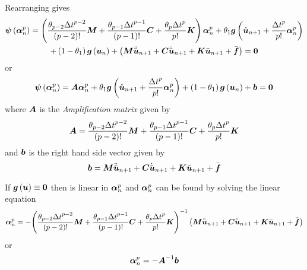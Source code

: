 Rearranging gives
\begin{multline}
  \fnof{\vect{\psi}}{\vect{\alpha}^{p}_{n}}=\pbrac{\dfrac{\theta_{p-2}{\Delta
        t}^{p-2}}{\factorial{p-2}}\matr{M}+\dfrac{\theta_{p-1}{\Delta
        t}^{p-1}}{\factorial{p-1}}\matr{C}+\dfrac{\theta_{p}{\Delta
        t}^{p}}{p!}\matr{K}}\vect{\alpha}^{p}_{n}+\theta_{1}\fnof{\vect{g}}{\hat{\vect{u}}_{n+1}+ 
    \dfrac{{\Delta t}^{p}}{p!}\vect{\alpha}^{p}_{n}} \\
  +\pbrac{1-\theta_{1}}\fnof{\vect{g}}{\vect{u}_{n}}+
  \pbrac{\matr{M}\ddot{\bar{\vect{u}}}_{n+1}+\matr{C}\dot{\bar{\vect{u}}}_{n+1}+\matr{K}\bar{\vect{u}}_{n+1}+
    \bar{\vect{f}}}= \vect{0}
  \label{eqn:transient}
\end{multline}
or 
\begin{equation}
\fnof{\vect{\psi}}{\vect{\alpha}^{p}_{n}}=\matr{A}\vect{\alpha}^{p}_{n}+
\theta_{1}\fnof{\vect{g}}{\hat{\vect{u}}_{n+1}+ \dfrac{{\Delta
      t}^{p}}{p!}\vect{\alpha}^{p}_{n}}+\pbrac{1-\theta_{1}}\fnof{\vect{g}}{\vect{u}_{n}}+\vect{b}= \vect{0}
\end{equation}
where $\matr{A}$ is the \emph{Amplification matrix} given by
\begin{equation}
  \matr{A}=\dfrac{\theta_{p-2}{\Delta t}^{p-2}}{\factorial{p-2}}\matr{M}+
  \dfrac{\theta_{p-1}{\Delta t}^{p-1}}{\factorial{p-1}}\matr{C}+
  \dfrac{\theta_{p}{\Delta t}^{p}}{p!}\matr{K}
\end{equation}
and $\vect{b}$ is the right hand side vector given by
\begin{equation}
  \vect{b}=\matr{M}\ddot{\bar{\vect{u}}}_{n+1}+\matr{C}\dot{\bar{\vect{u}}}_{n+1}+
  \matr{K}\bar{\vect{u}}_{n+1}+\bar{\vect{f}}
\end{equation}

If $\fnof{\vect{g}}{\vect{u}}\equiv\vect{0}$ then  is linear in
$\vect{\alpha}^{p}_{n}$ and $\vect{\alpha}^{p}_{n}$ can be found by solving
the linear equation
\begin{equation}
  \vect{\alpha}^{p}_{n} =-\inverse{\pbrac{\dfrac{\theta_{p-2}{\Delta t}^{p-2}}{\factorial{p-2}}\matr{M}+
      \dfrac{\theta_{p-1}{\Delta t}^{p-1}}{\factorial{p-1}}\matr{C}+
      \dfrac{\theta_{p}{\Delta
          t}^{p}}{p!}\matr{K}}}\pbrac{\matr{M}\ddot{\bar{\vect{u}}}_{n+1}+
    \matr{C}\dot{\bar{\vect{u}}}_{n+1}+\matr{K}\bar{\vect{u}}_{n+1}+\bar{\vect{f}}}
\end{equation}
or 
\begin{equation}
  \vect{\alpha}^{p}_{n} =-\inverse{\matr{A}}\vect{b}
\end{equation}

